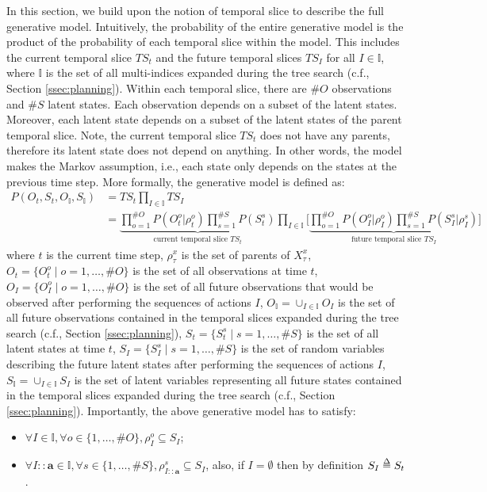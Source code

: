 \documentclass[twoside,11pt]{article}
\def\delequal{\mathrel{\ensurestackMath{\stackon[1pt]{=}{\scriptstyle\Delta}}}}
\newcommand{\nb}[1]{\# #1}
\begin{document}
In this section, we build upon the notion of temporal slice to describe the full generative model. Intuitively, the probability of the entire generative model is the product of the probability of each temporal slice within the model. This includes the current temporal slice $TS_t$ and the future temporal slices $TS_I$ for all $I \in \mathbb{I}$, where $\mathbb{I}$ is the set of all multi-indices expanded during the tree search (c.f., Section \ref{ssec:planning}). Within each temporal slice, there are $\nb{O}$ observations and $\nb{S}$ latent states. Each observation depends on a subset of the latent states. Moreover, each latent state depends on a subset of the latent states of the parent temporal slice. Note, the current temporal slice $TS_t$ does not have any parents, therefore its latent state does not depend on anything. In other words, the model makes the Markov assumption, i.e., each state only depends on the states at the previous time step. More formally, the generative model is defined as:
\begin{align*}
P(O_t,S_t,O_\mathbb{I},S_\mathbb{I}) &= TS_t \prod_{I\in\mathbb{I}} TS_I\\
&= \underbrace{\prod_{o=1}^{\nb{O}} P(O_t^o|\rho_t^o)\prod_{s=1}^{\nb{S}} P(S_t^s)}_{\text{current temporal slice }TS_t} \prod_{I\in\mathbb{I}} \Bigg[ \underbrace{\prod_{o=1}^{\nb{O}} P(O_I^o|\rho_I^o)\prod_{s=1}^{\nb{S}} P(S_I^s|\rho_I^s)}_{\text{future temporal slice }TS_I} \Bigg]
\end{align*}
where $t$ is the current time step, $\rho_\tau^x$ is the set of parents of $X^x_\tau$, $O_t = \{O_t^o \mid o = 1, \hdots, \nb{O}\}$ is the set of all observations at time $t$, $O_I = \{O_I^o \mid o = 1, \hdots, \nb{O}\}$ is the set of all future observations that would be observed after performing the sequences of actions $I$, $O_\mathbb{I} = \cup_{I \in \mathbb{I}} O_I$ is the set of all future observations contained in the temporal slices expanded during the tree search (c.f., Section \ref{ssec:planning}), $S_t = \{S_t^s \mid s = 1, \hdots, \nb{S}\}$ is the set of all latent states at time $t$, $S_I = \{S_I^s \mid s = 1, \hdots, \nb{S}\}$ is the set of random variables describing the future latent states after performing the sequences of actions $I$, $S_\mathbb{I} = \cup_{I \in \mathbb{I}} S_I$ is the set of latent variables representing all future states contained in the temporal slices expanded during the tree search (c.f., Section \ref{ssec:planning}). Importantly, the above generative model has to satisfy:
\begin{itemize}
\item $\forall I \in \mathbb{I}, \forall o \in \{1, \hdots, \nb{O}\}, \rho_I^o \subseteq S_I$;
\item $\forall I::\bm{a} \in \mathbb{I}, \forall s \in \{1, \hdots, \nb{S}\}, \rho_{I::\bm{a}}^s \subseteq S_I$, also, if $I = \emptyset$ then by definition $S_I \delequal S_t$.
\end{itemize}
\end{document}
